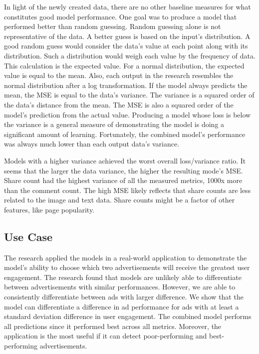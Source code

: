 \documentclass[mksc,blindrev]{informs3} %
\begin{document}
In light of the newly created data, there are no other baseline measures for what constitutes good model performance. One goal was to produce a model that performed better than random guessing. Random guessing alone is not representative of the data. A better guess is based on the input's distribution. A good random guess would consider the data's value at each point along with its distribution. Such a distribution would weigh each value by the frequency of data. This calculation is the expected value. For a normal distribution, the expected value is equal to the mean. Also, each output in the research resembles the normal distribution after a log transformation. If the model always predicts the mean, the MSE is equal to the data's variance. The variance is a squared order of the data's distance from the mean. The MSE is also a squared order of the model's prediction from the actual value. Producing a model whose loss is below the variance is a general measure of demonstrating the model is doing a significant amount of learning. Fortunately, the combined model's performance was always much lower than each output data's variance.

Models with a higher variance achieved the worst overall loss/variance ratio.  It seems that the larger the data variance, the higher the resulting mode's MSE.  Share count had the highest variance of all the measured metrics, 1000x more than the comment count.  The high MSE likely reflects that share counts are less related to the image and text data. Share counts might be a factor of other features, like page popularity.

\subsection{Use Case}

The research applied the models in a real-world application to demonstrate the model's ability to choose which two advertisements will receive the greatest user engagement. The research found that models are unlikely able to differentiate between advertisements with similar performances. However, we are able to consistently differentiate between ads with larger difference. We show that the model can differentiate a difference in ad performance for ads with at least a standard deviation difference in user engagement. The combined model performs all predictions since it performed best across all metrics. Moreover, the application is the most useful if it can detect poor-performing and best-performing advertisements.
\end{document}
